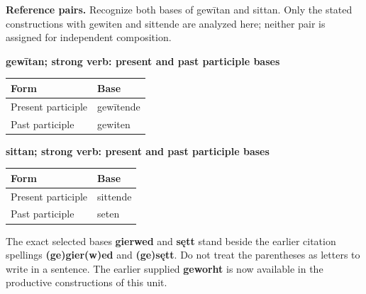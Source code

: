 \textbf{Reference pairs.} Recognize both bases of gewītan and sittan. Only the stated constructions with gewiten and sittende are analyzed here; neither pair is assigned for independent composition.

\textbf{gewītan; strong verb: present and past participle bases}

\par\begingroup
\fontsize{10.5}{13.2}\selectfont
\setlength{\LTleft}{0pt}\setlength{\LTright}{\fill}
\noindent
\begin{tabular}{@{}>{\raggedright\arraybackslash}p{69.84mm}>{\raggedright\arraybackslash}p{51.35mm}@{}}
\toprule
\textbf{Form} & \textbf{Base} \\
\midrule
Present participle & gewītende \\
Past participle & gewiten \\
\bottomrule
\end{tabular}
\par\endgroup

\textbf{sittan; strong verb: present and past participle bases}

\par\begingroup
\fontsize{10.5}{13.2}\selectfont
\setlength{\LTleft}{0pt}\setlength{\LTright}{\fill}
\noindent
\begin{tabular}{@{}>{\raggedright\arraybackslash}p{69.84mm}>{\raggedright\arraybackslash}p{51.35mm}@{}}
\toprule
\textbf{Form} & \textbf{Base} \\
\midrule
Present participle & sittende \\
Past participle & seten \\
\bottomrule
\end{tabular}
\par\endgroup

The exact selected bases \textbf{gierwed} and \textbf{sętt} stand beside the earlier citation spellings \textbf{(ge)gier(w)ed} and \textbf{(ge)sętt}. Do not treat the parentheses as letters to write in a sentence. The earlier supplied \textbf{geworht} is now available in the productive constructions of this unit.

